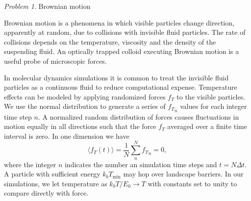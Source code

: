 \documentclass[preprint,showpacs,preprintnumbers,amsmath,amssymb,aps,prb]{revtex4-1}
\theoremstyle{remark}
\newtheorem{problem}{Problem}
\begin{document}
 \begin{problem}{Brownian motion}
  \label{ex:brownian}
  
\noindent Brownian motion is a phenomena in which 
  visible particles change direction,
  apparently at random, 
  due to collisions with invisible fluid particles.
  The rate of collisions depends on the temperature, viscosity
  and the density of 
  the suspending fluid.\cite{Einstein1905}
  An optically trapped colloid executing Brownian motion
  is a useful probe of microscopic forces.~\cite{Volpe2013}
  
  In molecular dynamics simulations
  it is common to treat the 
  invisible fluid particles as a continuous fluid
  to reduce computational expense.
  Temperature effects
  can be modeled by applying randomized forces $f_T$
  to the visible particles.
  We use the normal distribution 
  to generate a series of ${f_T}_n$ values for
  each integer time step $n$.\cite{numpy}
  A normalized random distribution of forces
  causes fluctuations in 
  motion 
  equally in all
  directions such that the force $f_T$
  averaged over a finite time interval
  is zero.  In one dimension we have 
  \begin{equation}
    \langle f_T(t) \rangle = \frac{1}{N} \sum_n^N {f_T}_n = 0,
  \end{equation}
  where the integer $n$ indicates the number an  
   simulation time steps and 
  $t = N \Delta t$.
  A particle
  with sufficient energy $k_b T_{\min}$ may 
  hop over landscape
  barriers.
  In our simulations,
  we let temperature as 
  $k_b T/E_0 \rightarrow T$
  with constants set to unity
  to
  compare directly with force. 
 

\end{problem}
\end{document}
